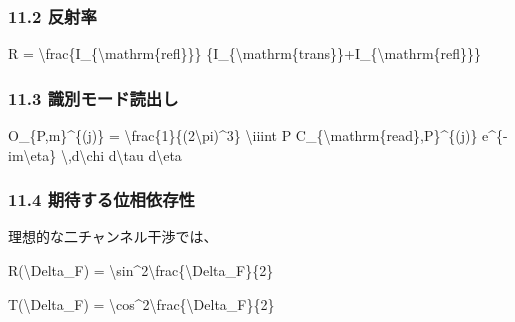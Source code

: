 \documentclass[
  a4paper,
]{article}
\newenvironment{Shaded}{}{}
\newcommand{\NormalTok}[1]{#1}
\begin{document}
\subsubsection{11.2 反射率}\label{ux53cdux5c04ux7387}

\begin{Shaded}
\begin{Highlighting}[]
\NormalTok{R}
\NormalTok{=}
\NormalTok{\textbackslash{}frac\{I\_\{\textbackslash{}mathrm\{refl\}\}\}}
\NormalTok{\{I\_\{\textbackslash{}mathrm\{trans\}\}+I\_\{\textbackslash{}mathrm\{refl\}\}\}}
\end{Highlighting}
\end{Shaded}

\subsubsection{11.3
識別モード読出し}\label{ux8b58ux5225ux30e2ux30fcux30c9ux8aadux51faux3057}

\begin{Shaded}
\begin{Highlighting}[]
\NormalTok{O\_\{P,m\}\^{}\{(j)\}}
\NormalTok{=}
\NormalTok{\textbackslash{}frac\{1\}\{(2\textbackslash{}pi)\^{}3\}}
\NormalTok{\textbackslash{}iiint}
\NormalTok{P}
\NormalTok{C\_\{\textbackslash{}mathrm\{read\},P\}\^{}\{(j)\}}
\NormalTok{e\^{}\{{-}im\textbackslash{}eta\}}
\NormalTok{\textbackslash{},d\textbackslash{}chi d\textbackslash{}tau d\textbackslash{}eta}
\end{Highlighting}
\end{Shaded}

\subsubsection{11.4
期待する位相依存性}\label{ux671fux5f85ux3059ux308bux4f4dux76f8ux4f9dux5b58ux6027}

理想的な二チャンネル干渉では、

\begin{Shaded}
\begin{Highlighting}[]
\NormalTok{R(\textbackslash{}Delta\_F)}
\NormalTok{=}
\NormalTok{\textbackslash{}sin\^{}2\textbackslash{}frac\{\textbackslash{}Delta\_F\}\{2\}}
\end{Highlighting}
\end{Shaded}

\begin{Shaded}
\begin{Highlighting}[]
\NormalTok{T(\textbackslash{}Delta\_F)}
\NormalTok{=}
\NormalTok{\textbackslash{}cos\^{}2\textbackslash{}frac\{\textbackslash{}Delta\_F\}\{2\}}
\end{Highlighting}
\end{Shaded}
\end{document}
